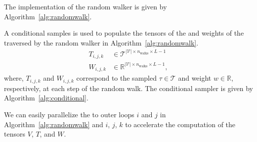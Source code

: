 The implementation of the random walker is given by Algorithm~\ref{alg:randomwalk}.


A conditional samples is used to populate the tensors of the  and weights of the  traversed by the random walker in Algorithm~\ref{alg:randomwalk}.
%
\begin{align}
	{T}_{i,j,k} &\in \mathcal{T}^{\lvert\mathcal{V}\rvert\times n_\text{walks} \times L-1}\\
	{W}_{i,j,k} &\in \mathbb{R}^{\lvert\mathcal{V}\rvert\times n_\text{walks} \times L-1},
\end{align}
%
where, ${T}_{i,j,k}$ and ${W}_{i,j,k}$ correspond to the sampled  $\tau \in \mathcal{T}$ and weight $w \in \mathbb{R}$, respectively, at each step of the random walk. The conditional sampler is given by Algorithm~\ref{alg:conditional}.


We can easily parallelize the to outer loops $i$ and $j$ in Algorithm~\ref{alg:randomwalk} and $i$, $j$, $k$ to accelerate the computation of the tensors $V$, $T$, and $W$.